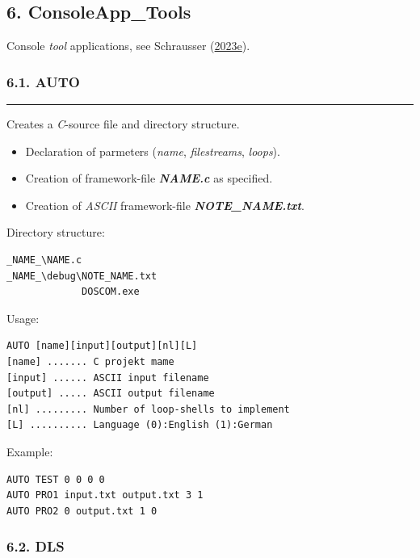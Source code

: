 \documentclass[
]{article}
\providecommand{\tightlist}{%
  \setlength{\itemsep}{0pt}\setlength{\parskip}{0pt}}
\begin{document}
\hypertarget{consoleapp_tools}{%
\subsection{6. ConsoleApp\_Tools}\label{consoleapp_tools}}

Console \emph{tool} applications, see Schrausser
(\href{https://doi.org/10.5281/zenodo.7655239}{2023e}).

\hypertarget{auto}{%
\subsubsection{6.1. AUTO}\label{auto}}

\begin{center}\rule{0.5\linewidth}{0.5pt}\end{center}

Creates a \emph{C}-source file and directory structure.

\begin{itemize}
\tightlist
\item
  Declaration of parmeters (\emph{name}, \emph{filestreams},
  \emph{loops}).
\item
  Creation of framework-file \textbf{\emph{NAME.c}} as specified.
\item
  Creation of \emph{ASCII} framework-file
  \textbf{\emph{NOTE\_NAME.txt}}.
\end{itemize}

Directory structure:

\begin{verbatim}
_NAME_\NAME.c
_NAME_\debug\NOTE_NAME.txt
             DOSCOM.exe
\end{verbatim}

Usage:

\begin{verbatim}
AUTO [name][input][output][nl][L]
[name] ....... C projekt mame 
[input] ...... ASCII input filename
[output] ..... ASCII output filename
[nl] ......... Number of loop-shells to implement
[L] .......... Language (0):English (1):German
\end{verbatim}

Example:

\begin{verbatim}
AUTO TEST 0 0 0 0
AUTO PRO1 input.txt output.txt 3 1
AUTO PRO2 0 output.txt 1 0
\end{verbatim}

\hypertarget{dls}{%
\subsubsection{6.2. DLS}\label{dls}}
\end{document}
